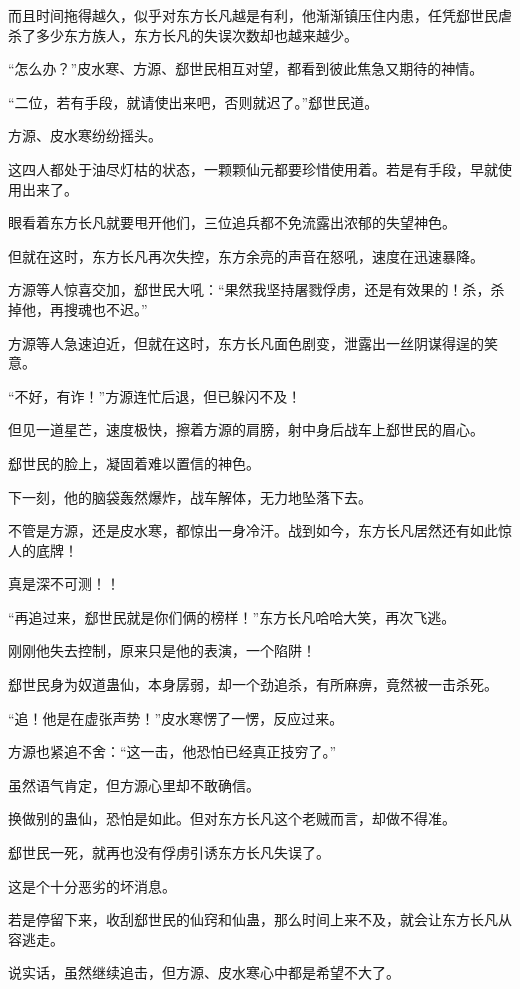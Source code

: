 \begin{this_body}
而且时间拖得越久，似乎对东方长凡越是有利，他渐渐镇压住内患，任凭郄世民虐杀了多少东方族人，东方长凡的失误次数却也越来越少。

“怎么办？”皮水寒、方源、郄世民相互对望，都看到彼此焦急又期待的神情。

“二位，若有手段，就请使出来吧，否则就迟了。”郄世民道。

方源、皮水寒纷纷摇头。

这四人都处于油尽灯枯的状态，一颗颗仙元都要珍惜使用着。若是有手段，早就使用出来了。

眼看着东方长凡就要甩开他们，三位追兵都不免流露出浓郁的失望神色。

但就在这时，东方长凡再次失控，东方余亮的声音在怒吼，速度在迅速暴降。

方源等人惊喜交加，郄世民大吼：“果然我坚持屠戮俘虏，还是有效果的！杀，杀掉他，再搜魂也不迟。”

方源等人急速迫近，但就在这时，东方长凡面色剧变，泄露出一丝阴谋得逞的笑意。

“不好，有诈！”方源连忙后退，但已躲闪不及！

但见一道星芒，速度极快，擦着方源的肩膀，射中身后战车上郄世民的眉心。

郄世民的脸上，凝固着难以置信的神色。

下一刻，他的脑袋轰然爆炸，战车解体，无力地坠落下去。

不管是方源，还是皮水寒，都惊出一身冷汗。战到如今，东方长凡居然还有如此惊人的底牌！

真是深不可测！！

“再追过来，郄世民就是你们俩的榜样！”东方长凡哈哈大笑，再次飞逃。

刚刚他失去控制，原来只是他的表演，一个陷阱！

郄世民身为奴道蛊仙，本身孱弱，却一个劲追杀，有所麻痹，竟然被一击杀死。

“追！他是在虚张声势！”皮水寒愣了一愣，反应过来。

方源也紧追不舍：“这一击，他恐怕已经真正技穷了。”

虽然语气肯定，但方源心里却不敢确信。

换做别的蛊仙，恐怕是如此。但对东方长凡这个老贼而言，却做不得准。

郄世民一死，就再也没有俘虏引诱东方长凡失误了。

这是个十分恶劣的坏消息。

若是停留下来，收刮郄世民的仙窍和仙蛊，那么时间上来不及，就会让东方长凡从容逃走。

说实话，虽然继续追击，但方源、皮水寒心中都是希望不大了。


\end{this_body}

